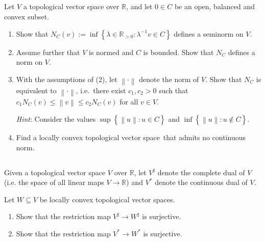 \documentclass[11pt, reqno,a4paper, twoside]{amsproc}
\newcommand{\dbR}{\mathbb R}
\newcommand{\set}[1]{\left\{{#1}\right\}}
\newcommand{\norm}[1]{\left\|#1\right\|}
\newcommand{\lctvs}{locally convex topological vector space}
\begin{document}
\subsection{}
Let $V$ a topological vector space over $\dbR$, and let $0\in C$ be an open, balanced and convex subset.
\begin{enumerate}
	\item Show that $N_C(v):=\inf\set{\lambda\in\dbR_{> 0}: \lambda^{-1} v\in C}$ defines a seminorm on $V$.
	\item  Assume further that $V$ is normed and $C$ is bounded. Show that $N_C$ defines a norm on $V$. 
	\item  With the assumptions of (2), let $\norm{\cdot}$ denote the norm of $V$. Show that $N_C$ is equivalent to $\norm{\cdot}$, i.e.\ there exist $c_1,c_2>0$ such that $c_1 N_C(v)\le \norm{v}\le c_2 N_C(v)$ for all $v\in V$. 
	
	\textit{Hint}: Consider the values $\sup\set{\norm{u}:u\in C}$ and $\inf\set{\norm{u}:u\notin C}$. 
	\item Find a \lctvs~that admits no continuous norm.
\end{enumerate}

\subsection{}
Given a topological vector space $V$ over $\dbR$, let $V^\sharp$ denote the complete dual of $V$ (i.e. the space of all linear maps $V\to\dbR$) and $V^*$ denote the continuous dual of $V$.

Let $W\subseteq V$ be \lctvs s.
\begin{enumerate}
	\item Show that the restriction map $V^\sharp\to W^\sharp$ is surjective.
	\item Show that the restriction map $V^*\to W^*$ is surjective.
\end{enumerate}
\end{document}
